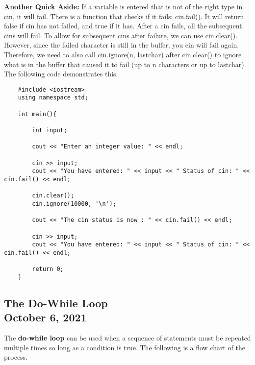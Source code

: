 \documentclass[]{article}
\begin{document}
\textbf{Another Quick Aside:} If a variable is entered that is not of the right type in cin, it will fail. There is a function that checks if it fails: cin.fail(). It will return false if cin has not failed, and true if it has. After a cin fails, all the subsequent cins will fail. To allow for subsequent cins after failure, we can use cin.clear(). However, since the failed character is still in the buffer, you cin will fail again. Therefore, we need to also call cin.ignore(n, lastchar) after cin.clear() to ignore what is in the buffer that caused it to fail (up to n characters or up to lastchar). The following code demonstrates this. \\

\begin{lstlisting}
	#include <iostream>
	using namespace std;
	
	int main(){
		
		int input;
		
		cout << "Enter an integer value: " << endl;
		
		cin >> input;
		cout << "You have entered: " << input << " Status of cin: " << cin.fail() << endl;
		
		cin.clear();
		cin.ignore(10000, '\n');
		
		cout << "The cin status is now : " << cin.fail() << endl;
		
		cin >> input;
		cout << "You have entered: " << input << " Status of cin: " << cin.fail() << endl;
		
		return 0;
	}
\end{lstlisting}\bigbreak


\subsection{The Do-While Loop\\ {\large \normalfont October 6, 2021}}
\bigbreak

The \textbf{do-while loop} can be used when a sequence of statements must be repeated multiple times so long as a condition is true. The following is a flow chart of the process.
\end{document}
